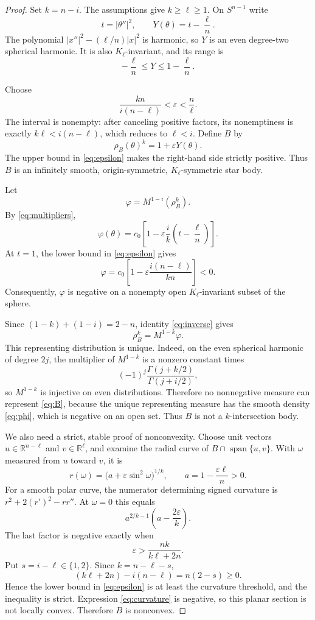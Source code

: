 \documentclass[11pt]{article}
\newcommand{\R}{\mathbb R}
\begin{document}
\begin{proof}
Set $k=n-i$.  The assumptions give $k\geq\ell\geq1$.  On $S^{n-1}$ write
\[
 t=|\theta''|^2,
 \qquad Y(\theta)=t-\frac\ell n.
\]
The polynomial $|x''|^2-(\ell/n)|x|^2$ is harmonic, so $Y$ is an even
degree-two spherical harmonic.  It is also $K_\ell$-invariant, and its range
is
\[
 -\frac\ell n\leq Y\leq1-\frac\ell n.
\]

Choose
\begin{equation}\label{eq:epsilon}
 \frac{kn}{i(n-\ell)}<\varepsilon<\frac n\ell.
\end{equation}
The interval is nonempty: after canceling positive factors, its nonemptiness
is exactly $k\ell<i(n-\ell)$, which reduces to $\ell<i$.
Define $B$ by
\begin{equation}\label{eq:B}
 \rho_B(\theta)^k=1+\varepsilon Y(\theta).
\end{equation}
The upper bound in \eqref{eq:epsilon} makes the right-hand side strictly
positive.  Thus $B$ is an infinitely smooth, origin-symmetric,
$K_\ell$-symmetric star body.

Let
\[
 \varphi=M^{1-i}(\rho_B^k).
\]
By \eqref{eq:multipliers},
\begin{equation}\label{eq:phi}
 \varphi(\theta)=c_0\left[1-\varepsilon\frac{i}{k}
 \left(t-\frac\ell n\right)\right].
\end{equation}
At $t=1$, the lower bound in \eqref{eq:epsilon} gives
\[
 \varphi=c_0\left[1-\varepsilon\frac{i(n-\ell)}{kn}\right]<0.
\]
Consequently, $\varphi$ is negative on a nonempty open
$K_\ell$-invariant subset of the sphere.

Since $(1-k)+(1-i)=2-n$, identity \eqref{eq:inverse} gives
\[
 \rho_B^k=M^{1-k}\varphi.
\]
This representing distribution is unique.  Indeed, on the even spherical
harmonic of degree $2j$, the multiplier of $M^{1-k}$ is a nonzero constant
times
\[
 (-1)^j\frac{\Gamma(j+k/2)}{\Gamma(j+i/2)},
\]
so $M^{1-k}$ is injective on even distributions.  Therefore no nonnegative
measure can represent \eqref{eq:B}, because the unique representing measure
has the smooth density \eqref{eq:phi}, which is negative on an open set.
Thus $B$ is not a $k$-intersection body.

We also need a strict, stable proof of nonconvexity.  Choose unit vectors
$u\in\R^{n-\ell}$ and $v\in\R^\ell$, and examine the radial curve of
$B\cap\operatorname{span}\{u,v\}$.  With $\omega$ measured from $u$ toward
$v$, it is
\[
 r(\omega)=\bigl(a+\varepsilon\sin^2\omega\bigr)^{1/k},
 \qquad a=1-\frac{\varepsilon\ell}{n}>0.
\]
For a smooth polar curve, the numerator determining signed curvature is
$r^2+2(r')^2-rr''$.  At $\omega=0$ this equals
\begin{equation}\label{eq:curvature}
 a^{2/k-1}\left(a-\frac{2\varepsilon}{k}\right).
\end{equation}
The last factor is negative exactly when
\[
 \varepsilon>\frac{nk}{k\ell+2n}.
\]
Put $s=i-\ell\in\{1,2\}$.  Since $k=n-\ell-s$,
\[
 (k\ell+2n)-i(n-\ell)=n(2-s)\geq0.
\]
Hence the lower bound in \eqref{eq:epsilon} is at least the curvature
threshold, and the inequality is strict.  Expression
\eqref{eq:curvature} is negative, so this planar section is not locally
convex.  Therefore $B$ is nonconvex.


\end{proof}
\end{document}
